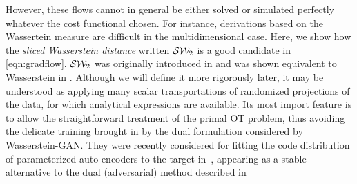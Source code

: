 However, these flows cannot in general be either solved or simulated perfectly whatever the cost functional chosen. For instance, derivations based on the Wassertein measure are difficult in the multidimensional case.  Here, we show how the \textit{sliced Wasserstein distance} written ${\cal S}{\cal W}_2$ is a good candidate in \eqref{eqn:gradflow}. ${\cal S}{\cal W}_2$ was originally introduced in \cite{pitie2005n} and was shown equivalent to Wasserstein in \cite{bonnotte2013unidimensional}. Although we will define it more rigorously later, it may be understood as applying many scalar transportations of randomized projections of the data, for which analytical expressions are available. Its most import feature is to allow the straightforward treatment of the primal OT problem, thus avoiding the delicate training brought in by the dual formulation considered by Wasserstein-GAN. They were recently considered for fitting the code distribution of parameterized auto-encoders to the target in~\cite{kolouri2018sliced}, appearing as a stable alternative to the dual (adversarial) method described in~\cite{makhzani2015adversarial}

